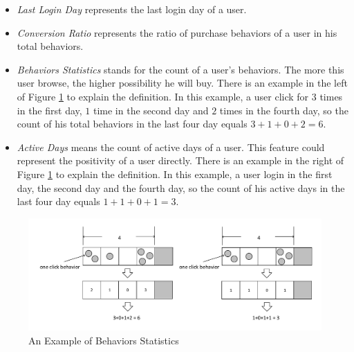 \documentclass{llncs}
\begin{document}
\begin{itemize}
	\item \emph{Last Login Day} represents the last login day of a user.
	
	\item \emph{Conversion Ratio} represents the ratio of purchase behaviors of a user
	in his total behaviors.
	
	\item \emph{Behaviors Statistics} stands for the count of a user's behaviors.
	The more this user browse, the higher possibility he will buy.
	There is an example in the left of Figure \ref{fig:active} to explain the definition.
	In this example, a user click for $3$ times in the first day, $1$ time in the second day and
	$2$ times in the fourth day, so the count of his total behaviors in the last four day equals
	$3 + 1 + 0 + 2 = 6$.
	
	\item \emph{Active Days} means the count of active days of a user.
	This feature could represent the positivity of a user directly.
	There is an example in the right of Figure \ref{fig:active} to explain the definition.
	In this example, a user login in the first day, the second day and
	the fourth day, so the count of his active days in the last four day equals
	$1 + 1 + 0 + 1 = 3$.
	
\end{itemize}

\begin{figure}[htbp]
	\centering
	\includegraphics[scale=0.5]{images/active.pdf}
	\caption{An Example of Behaviors Statistics}
	\label{fig:active}
\end{figure}
\end{document}
